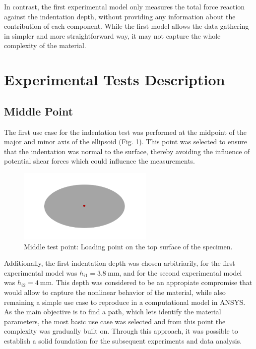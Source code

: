 In contrast, the first experimental model only measures the total force reaction 
against the indentation depth, without providing any information about the contribution 
of each component. While the first model allows the data 
gathering in simpler and more straightforward way, it may not capture 
the whole complexity of the material.


\section{Experimental Tests Description}

\subsection{Middle Point}
\label{subsection:midpoint}
The first use case for the indentation test was performed at the midpoint 
of the major and minor axis of the ellipsoid (Fig. \ref{fig:midpoint}). This point was selected 
to ensure that the indentation was normal to the surface, thereby avoiding 
the influence of potential shear forces which could influence the 
measurements.

\begin{figure}%
    \centering
   \quad
   \includegraphics[width=6.5cm]{Images/Experiment/specimenmidp.png}%
   \caption{Middle test point: Loading point on the top surface of the specimen.}%
   \label{fig:midpoint}%
\end{figure}

Additionally, the first indentation depth was chosen arbitriarily, for the first 
experimental model was $h_{i1} = \SI{3.8}{\milli \m}$, and for the second 
experimental model was $h_{i2} = \SI{4}{\milli \m}$. This depth was considered 
to be an appropiate compromise that would allow to capture the nonlinear 
behavior of the material, while also remaining a simple use case to 
reproduce in a computational model in ANSYS.\\

As the main objective is to find a path, which lets identify the material 
 parameters, the most basic use case was selected and from this point 
the complexity was gradually built on. Through this approach, it was possible 
to establish a solid foundation for the subsequent experiments and data analysis.



